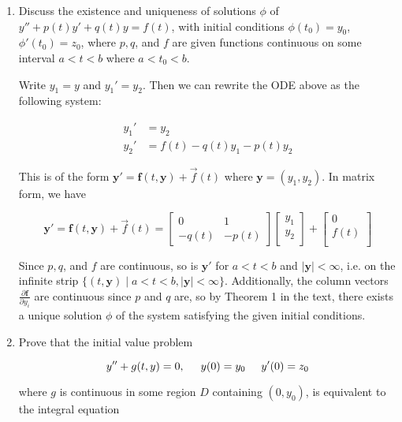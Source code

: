 \documentclass[11pt,oneside,english]{amsart}
\theoremstyle{definition}
\newcommand{\pp}[2]{\frac{\partial{#1}}{\partial{#2}}}
\begin{document}
\begin{enumerate}
\begin{proof}
Since $f(t)\leq U(t)$ by construction, it follows that 


\[
f(t)\leq K_1e^{K_2(t-\alpha)}+\frac{\varepsilon}{K_2}\left(e^{K_2(t-\alpha)}-1\right).
\]


\end{proof}


\item Discuss the existence and uniqueness of solutions $\phi$ of $y''+p(t)y'+q(t)y=f(t)$, with initial conditions $\phi(t_0)=y_0$, $\phi'(t_0)=z_0$, where $p,q$, and $f$ are given functions continuous on some interval $a<t<b$ where $a<t_0<b$.


Write $y_1=y$ and $y_1'=y_2$. Then we can rewrite the ODE above as the following system:

\begin{align*}
y_1'&=y_2\\[2mm]
y_2'&=f(t)-q(t)y_1-p(t)y_2
\end{align*}

This is of the form $\mathbf{y}'=\mathbf{f}(t,\mathbf{y})+\vec{f}(t)$ where $\mathbf{y}=(y_1,y_2)$. In matrix form, we have

\[\mathbf{y}'=\mathbf{f}(t,\mathbf{y})+\vec{f}(t)=
\begin{bmatrix}
0 & 1\\
-q(t) & -p(t)
\end{bmatrix}
\begin{bmatrix}
y_1\\
y_2\\
\end{bmatrix}+
\begin{bmatrix}
0\\
f(t)\\
\end{bmatrix}
\]

Since $p, q$, and $f$ are continuous, so is $\mathbf{y}'$ for $a<t<b$ and $|\mathbf{y}|<\infty$, i.e. on the infinite strip $\{(t,\mathbf{y})\mid a<t<b, |\mathbf{y}|<\infty\}$. Additionally, the column vectors $\pp{\mathbf{f}}{y_i}$ are continuous since $p$ and $q$ are, so by Theorem 1 in the text, there exists a unique solution $\phi$ of the system satisfying the given initial conditions.


\item Prove that the initial value problem

\[
y''+g(t,y)=0,\hspace{5mm}y(0)=y_0\hspace{5mm}y'(0)=z_0
\]

where $g$ is continuous in some region $D$ containing $(0,y_0)$, is equivalent to the integral equation


\end{enumerate}
\end{document}
